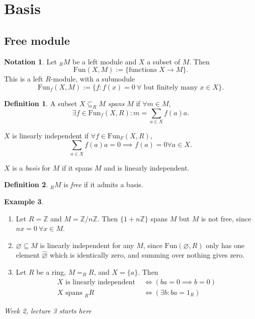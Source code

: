 \documentclass[a4paper]{article}
\newcommand{\Z}{\mathbb{Z}}
\newcommand{\Fun}{\text{Fun}}
\theoremstyle{definition}
\newtheorem{defn}{Definition}[subsection]
\newtheorem{example}[defn]{Example}
\newtheorem*{notation}{Notation}
\begin{document}
\section{Basis}
\subsection{Free module}
\begin{notation}
Let $_RM$ be a left module and $X$ a subset of $M$. Then
\[
\Fun(X,M):=\{\text{functions }X\rightarrow M\}.
\]
This is a left $R$-module, with a submodule
\[
\Fun_f(X,M):=\{f:f(x)=0 \ \forall \text{ but finitely many } x\in X\}.
\]
\end{notation}

\begin{defn}
A subset $X\subseteq _RM$ \textit{spans} $M$ if $\forall m\in M$,
\[
\exists f\in\Fun_f(X,R):m=\sum_{a\in X}f(a)a.
\]

$X$ is linearly independent if $\forall f\in\Fun_F(X,R)$,
\[
\sum_{a\in X} f(a)a=0\implies f(a)=0\forall a\in X.
\]

$X$ is a \textit{basis} for $M$ if it spans $M$ and is linearly independent.
\end{defn}

\begin{defn}
$_RM$ is \textit{free} if it admits a basis.
\end{defn}

\begin{example}
\begin{enumerate}
\item Let $R=\Z$ and $M=\Z/n\Z$. Then $\{1+n\Z\}$ spans $M$ but $M$ is not free, since $nx=0 \ \forall x\in M$.
\item $\varnothing\subseteq M$ is linearly independent for any $M$, since $\Fun(\varnothing,R)$ only has one element $\widehat{\varnothing}$ which is identically zero, and summing over nothing gives zero.
\item Let $R$ be a ring, $M=_RR$, and $X=\{a\}$. Then
\[
\begin{aligned}
X\text{ is linearly independent } &\iff (ba=0\implies b=0)\\
X\text{ spans } _RR &\iff (\exists b:ba=1_R)
\end{aligned}
\]
\end{enumerate}
\end{example}

\begin{flushright}
\textit{Week 2, lecture 3 starts here}
\end{flushright}
\end{document}

